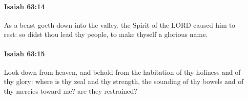 		\paragraph{Isaiah 63:14} %
			\label{ISAIAH-63-14}

			As a beast goeth down into the valley, the Spirit of the LORD caused him to rest: so didst thou lead thy people, to make thyself a glorious name.


		\paragraph{Isaiah 63:15} %
			\label{ISAIAH-63-15}

			Look down from heaven, and behold from the habitation of thy holiness and of thy glory: where is thy zeal and thy strength, the sounding of thy bowels and of thy mercies toward me? are they restrained?


